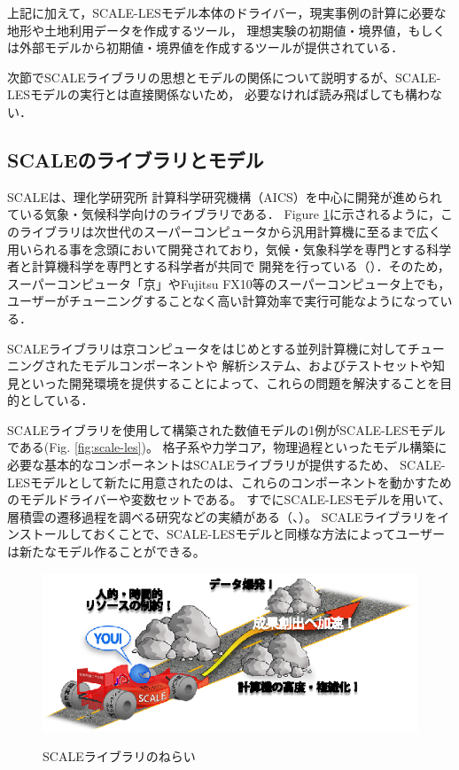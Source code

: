 上記に加えて，SCALE-LESモデル本体のドライバー，現実事例の計算に必要な地形や土地利用データを作成するツール，
理想実験の初期値・境界値，もしくは外部モデルから初期値・境界値を作成するツールが提供されている．

次節でSCALEライブラリの思想とモデルの関係について説明するが、SCALE-LESモデルの実行とは直接関係ないため，
必要なければ読み飛ばしても構わない．


\subsection{SCALEのライブラリとモデル}
SCALEは、理化学研究所 計算科学研究機構（AICS）を中心に開発が進められている気象・気候科学向けのライブラリである．
Figure \ref{fig:scale}に示されるように，このライブラリは次世代のスーパーコンピュータから汎用計算機に至るまで広く
用いられる事を念頭において開発されており，気候・気象科学を専門とする科学者と計算機科学を専門とする科学者が共同で
開発を行っている（\cite{abe_2011}）．そのため，スーパーコンピュータ「京」やFujitsu FX10等のスーパーコンピュータ上でも，
ユーザーがチューニングすることなく高い計算効率で実行可能なようになっている．

SCALEライブラリは京コンピュータをはじめとする並列計算機に対してチューニングされたモデルコンポーネントや
解析システム、およびテストセットや知見といった開発環境を提供することによって、これらの問題を解決することを目的としている．

SCALEライブラリを使用して構築された数値モデルの1例がSCALE-LESモデルである(Fig. \ref{fig:scale-les})。
格子系や力学コア，物理過程といったモデル構築に必要な基本的なコンポーネントはSCALEライブラリが提供するため、
SCALE-LESモデルとして新たに用意されたのは、これらのコンポーネントを動かすためのモデルドライバーや変数セットである。
すでにSCALE-LESモデルを用いて、層積雲の遷移過程を調べる研究などの実績がある（\cite{satoy_2014}、\cite{satoy_2015}）。
SCALEライブラリをインストールしておくことで、SCALE-LESモデルと同様な方法によってユーザーは新たなモデル作ることができる。


\begin{figure}[t]
\begin{center}
  \includegraphics[width=0.9\hsize]{./figure/library.eps}\\
  \caption{SCALEライブラリのねらい}
  \label{fig:scale}
\end{center}
\end{figure}

